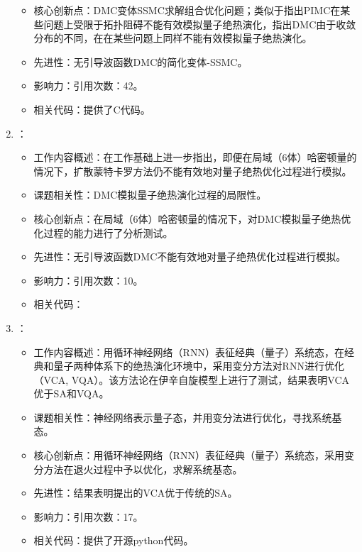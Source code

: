\begin{enumerate}
\begin{itemize}
                \item 核心创新点：DMC变体SSMC求解组合优化问题；类似于\citet{hastings2013obstructions}指出PIMC在某些问题上受限于拓扑阻碍不能有效模拟量子绝热演化，指出DMC由于收敛分布的不同，在在某些问题上同样不能有效模拟量子绝热演化。
                \item 先进性：无引导波函数DMC的简化变体-SSMC。
                \item 影响力：引用次数：42。
                \item 相关代码：提供了C代码。
            \end{itemize}
            \item \citet{bringewatt2018diffusion}：
            \begin{itemize}
                \item 工作内容概述：在\citet{jarret2016adiabatic}工作基础上进一步指出，即便在局域（6体）哈密顿量的情况下，扩散蒙特卡罗方法仍不能有效地对量子绝热优化过程进行模拟。
                \item 课题相关性：DMC模拟量子绝热演化过程的局限性。
                \item 核心创新点：在局域（6体）哈密顿量的情况下，对DMC模拟量子绝热优化过程的能力进行了分析测试。
                \item 先进性：无引导波函数DMC不能有效地对量子绝热优化过程进行模拟。
                \item 影响力：引用次数：10。
                \item 相关代码：
            \end{itemize}
            \item \citet{hibat2021variational}：
            \begin{itemize}
                \item 工作内容概述：用循环神经网络（RNN）表征经典（量子）系统态，在经典和量子两种体系下的绝热演化环境中，采用变分方法对RNN进行优化（VCA, VQA）。该方法论在伊辛自旋模型上进行了测试，结果表明VCA优于SA和VQA。
                \item 课题相关性：神经网络表示量子态，并用变分法进行优化，寻找系统基态。
                \item 核心创新点：用循环神经网络（RNN）表征经典（量子）系统态，采用变分方法在退火过程中予以优化，求解系统基态。
                \item 先进性：结果表明提出的VCA优于传统的SA。
                \item 影响力：引用次数：17。
                \item 相关代码：提供了开源python代码。
            \end{itemize}


\end{enumerate}
